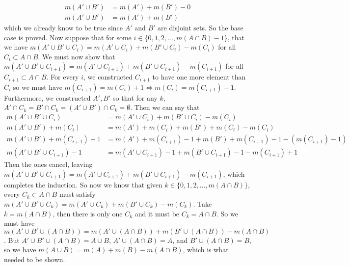 \documentclass[11pt]{article}
\begin{document}
\begin{exercise}{7}{14}
{\begin{align*}
            m(A' \cup B') &= m(A') + m(B') - 0 \\
            m(A' \cup B') &= m(A') + m(B')
        \end{align*}
        which we already know to be true since $A'$ and $B'$ are disjoint sets.
        So the base case is proved. \parspace
        Now suppose that for some $i \in \{ 0, 1, 2, ..., m(A \cap B) - 1 \}$, that we have $m(A' \cup B' \cup C_i) = m(A' \cup C_i) + m(B' \cup C_i) - m(C_i)$ for all $C_i \subset A \cap B$.
        We must now show that $m(A' \cup B' \cup C_{i+1}) = m(A' \cup C_{i+1}) + m(B' \cup C_{i+1}) - m(C_{i+1})$ for all $C_{i+1} \subset A \cap B$. \parspace
        For every $i$, we constructed $C_{i+1}$ to have one more element than $C_i$ so we must have $m(C_{i+1}) = m(C_i) + 1 \iff m(C_i) = m(C_{i+1}) - 1$.
        Furthermore, we constructed $A', B'$ so that for any $k$, $A' \cap C_k = B' \cap C_k = (A' \cup B') \cap C_k = \emptyset$.
        Then we can say that
        \begin{align*}
            m(A' \cup B' \cup C_i) &= m(A' \cup C_i) + m(B' \cup C_i) - m(C_i) \\
            m(A' \cup B') + m(C_i) &= m(A') + m(C_i) + m(B') + m(C_i) - m(C_i) \\
            m(A' \cup B') + m(C_{i+1}) - 1 &= m(A') + m(C_{i+1}) - 1 + m(B') + m(C_{i+1}) - 1 - (m(C_{i+1}) - 1) \\
            m(A' \cup B' \cup C_{i+1}) - 1 &= m(A' \cup C_{i+1}) - 1 + m(B' \cup C_{i+1}) - 1 - m(C_{i+1}) + 1
        \end{align*}
        Then the ones cancel, leaving $m(A' \cup B' \cup C_{i+1}) = m(A' \cup C_{i+1}) + m(B' \cup C_{i+1}) - m(C_{i+1})$, which completes the induction. \parspace
        So now we know that given $k \in \{ 0, 1, 2, ..., m(A \cap B) \}$, every $C_k \subset A \cap B$ must satisfy $m(A' \cup B' \cup C_k) = m(A' \cup C_k) + m(B' \cup C_k) - m(C_k)$.
        Take $k = m(A \cap B) $, then there is only one $C_k$ and it must be $C_k = A \cap B$.
        So we must have $ m(A' \cup B' \cup (A \cap B)) = m(A' \cup (A \cap B)) +m (B' \cup (A \cap B)) - m(A \cap B)$.
        But $A' \cup B' \cup (A \cap B) = A \cup B$, $A' \cup (A \cap B) = A$, and $B' \cup (A \cap B) = B$, so we have $m(A \cup B) = m(A) + m(B) - m(A \cap B)$, which is what needed to be shown.
    }
\end{exercise}

\end{document}

